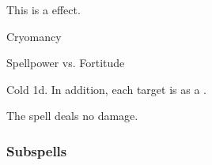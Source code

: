 \par


This is a  effect.

\newpage
\begin{spellsection}{Cryomancy}

\begin{spellheader}
\end{spellheader}

\begin{spellcontent}

\begin{spelltargetinginfo}




\end{spelltargetinginfo}


\begin{spelleffects}




\begin{spellattack}{Spellpower vs. Fortitude}


\hit
Cold  \minus1d.
In addition, each target is \fatigued as a .



\end{spellattack}





\end{spelleffects}

\end{spellcontent}
\begin{spellfooter}


\end{spellfooter}
\begin{spellsubcontent}


\begin{spellcantrip}
The spell deals no damage.
\end{spellcantrip}


\end{spellsubcontent}
\end{spellsection}


\subsubsection{Subspells}



